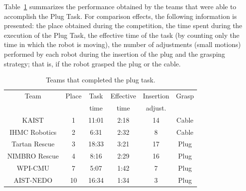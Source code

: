 		Table~\ref{tab:teams} summarizes the performance obtained by the teams that were able to
		accomplish the Plug Task.
		For comparison effects, the following information is presented:
		the place obtained during the competition, the time spent during the execution of the Plug Task,
		the effective time of the task (by counting only the time in which the robot is moving),
		the number of adjustments (small motions) performed by each robot during the insertion of the plug
		and the grasping strategy; that is, if the robot grasped the plug or the cable.
		
		\begin{table}[t]
			\caption{Teams that completed the plug task.}
			\label{tab:teams}
			\centering
			\begin{tabular}{cccccc}
				\hline
				Team 					& Place	& Task	& Effective & Insertion	& Grasp	\\
											& 			& time	& time			& adjust.		& 			\\
				\hline
				KAIST					& 1			& 11:01	& 2:18			& 14				& Cable	\\
				IHMC Robotics	& 2			& 6:31	& 2:32			& 8					& Cable	\\
				Tartan Rescue	& 3			& 18:33	& 3:21			& 17				& Plug	\\
				NIMBRO Rescue	& 4			& 8:16	& 2:29			& 16				& Plug	\\
				WPI-CMU				& 7			& 5:07	& 1:42			& 7					& Plug	\\
				AIST-NEDO			& 10		& 16:34	& 1:34			& 3					& Plug	\\
				\hline
			\end{tabular}
		\end{table}